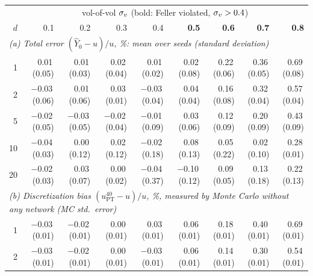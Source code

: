 \begin{table}[t]
\centering\small
\setlength{\tabcolsep}{4.2pt}
\begin{tabular}{rrrrrrrrr}
\toprule
 & \multicolumn{8}{c}{vol-of-vol $\sigma_v$ (bold: Feller violated, $\sigma_v>0.4$)}\\
$d$ & 0.1 & 0.2 & 0.3 & 0.4 & \textbf{0.5} & \textbf{0.6} & \textbf{0.7} & \textbf{0.8}\\
\midrule
\multicolumn{9}{l}{\emph{(a) Total error $(\hat Y_0-u)/u$, \%: mean over seeds (standard deviation)}}\\
1 & 0.01\,{\scriptsize(0.05)} & 0.01\,{\scriptsize(0.03)} & 0.02\,{\scriptsize(0.04)} & 0.01\,{\scriptsize(0.02)} & 0.02\,{\scriptsize(0.08)} & 0.22\,{\scriptsize(0.06)} & 0.36\,{\scriptsize(0.05)} & 0.69\,{\scriptsize(0.08)}\\
2 & $-$0.03\,{\scriptsize(0.06)} & 0.01\,{\scriptsize(0.06)} & 0.03\,{\scriptsize(0.01)} & $-$0.03\,{\scriptsize(0.04)} & 0.04\,{\scriptsize(0.04)} & 0.16\,{\scriptsize(0.08)} & 0.32\,{\scriptsize(0.04)} & 0.57\,{\scriptsize(0.04)}\\
5 & $-$0.02\,{\scriptsize(0.05)} & $-$0.03\,{\scriptsize(0.05)} & $-$0.02\,{\scriptsize(0.04)} & $-$0.01\,{\scriptsize(0.09)} & 0.03\,{\scriptsize(0.06)} & 0.12\,{\scriptsize(0.09)} & 0.20\,{\scriptsize(0.09)} & 0.43\,{\scriptsize(0.09)}\\
10 & $-$0.04\,{\scriptsize(0.03)} & 0.00\,{\scriptsize(0.12)} & 0.02\,{\scriptsize(0.12)} & $-$0.02\,{\scriptsize(0.18)} & 0.08\,{\scriptsize(0.13)} & 0.05\,{\scriptsize(0.22)} & 0.02\,{\scriptsize(0.10)} & 0.28\,{\scriptsize(0.01)}\\
20 & $-$0.02\,{\scriptsize(0.03)} & 0.03\,{\scriptsize(0.07)} & 0.00\,{\scriptsize(0.02)} & $-$0.04\,{\scriptsize(0.37)} & $-$0.10\,{\scriptsize(0.12)} & 0.09\,{\scriptsize(0.05)} & 0.13\,{\scriptsize(0.18)} & 0.22\,{\scriptsize(0.13)}\\
\midrule
\multicolumn{9}{l}{\emph{(b) Discretization bias $(u^{40}_{\mathrm{PT}}-u)/u$, \%, measured by Monte Carlo without any network (MC std.\ error)}}\\
1 & $-$0.03\,{\scriptsize(0.01)} & $-$0.02\,{\scriptsize(0.01)} & 0.00\,{\scriptsize(0.01)} & 0.03\,{\scriptsize(0.01)} & 0.06\,{\scriptsize(0.01)} & 0.18\,{\scriptsize(0.01)} & 0.40\,{\scriptsize(0.01)} & 0.69\,{\scriptsize(0.01)}\\
2 & $-$0.03\,{\scriptsize(0.01)} & $-$0.02\,{\scriptsize(0.01)} & 0.00\,{\scriptsize(0.01)} & $-$0.03\,{\scriptsize(0.01)} & 0.06\,{\scriptsize(0.01)} & 0.14\,{\scriptsize(0.01)} & 0.30\,{\scriptsize(0.01)} & 0.54\,{\scriptsize(0.01)}\\

\end{tabular}
\end{table}
